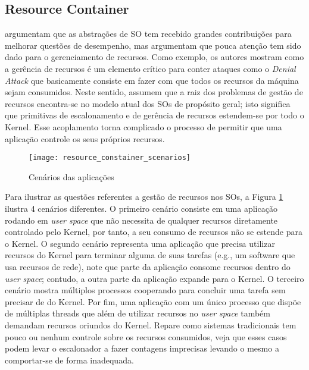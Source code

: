 \subsection{Resource Container}

\cite{resourcecontainers} argumentam que as abstrações de SO tem recebido
grandes contribuições para melhorar questões de desempenho, mas argumentam que
pouca atenção tem sido dado para o gerenciamento de recursos. Como exemplo, os
autores mostram como a gerência de recursos é um elemento crítico para conter
ataques como o \emph{Denial Attack} que basicamente consiste em fazer
com que todos os recursos da máquina sejam consumidos. Neste sentido,
\cite{resourcecontainers} assumem que a raiz dos problemas de gestão de
recursos encontra-se no modelo atual dos SOs de propósito geral; isto significa
que primitivas de escalonamento e de gerência de recursos estendem-se por todo
o Kernel. Esse acoplamento torna complicado o processo de permitir que uma
aplicação controle os seus próprios recursos.

\begin{figure}[!h]
  \centering
  \texttt{[image: resource\_constainer\_scenarios]} 
  \caption{Cenários das aplicações}
  \label{fig:resource_constainer_scenarios}
\end{figure}

Para ilustrar as questões referentes a gestão de recursos nos SOs, a Figura
\ref{fig:resource_constainer_scenarios} ilustra 4 cenários diferentes. O
primeiro cenário consiste em uma aplicação rodando em \textit{user space} que
não necessita de qualquer recursos diretamente controlado pelo Kernel, por
tanto, a seu consumo de recursos não se estende para o Kernel. O segundo
cenário representa uma aplicação que precisa utilizar recursos do Kernel para
terminar alguma de suas tarefas (e.g., um software que usa recursos de rede),
note que parte da aplicação consome recursos dentro do \textit{user space};
contudo, a outra parte da aplicação expande para o Kernel. O terceiro cenário
mostra múltiplos processos cooperando para concluir uma tarefa sem precisar de
do Kernel. Por fim, uma aplicação com um único processo que dispõe de
múltiplas threads que além de utilizar recursos no \textit{user space} também
demandam recursos oriundos do Kernel. Repare como sistemas tradicionais tem
pouco ou nenhum controle sobre os recursos consumidos, veja que esses casos
podem levar o escalonador a fazer contagens imprecisas levando o mesmo a
comportar-se de forma inadequada.

